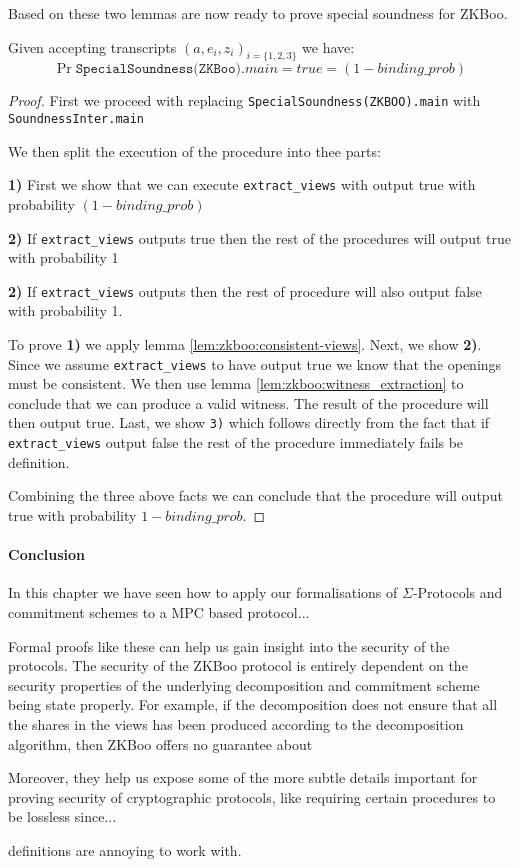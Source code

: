 Based on these two lemmas are now ready to prove special soundness for ZKBoo.

\begin{lemma}
  Given accepting transcripts $(a, e_{i}, z_{i})_{i = \{1,2,3\}}$ we have:
  \[
    \Pr{\texttt{SpecialSoundness(ZKBoo)}.main = true} = (1 - binding\_{prob})
  \]
\end{lemma}
\begin{proof}
  First we proceed with replacing \texttt{SpecialSoundness(ZKBOO).main} with \texttt{SoundnessInter.main}

  We then split the execution of the procedure into thee parts:

  \noindent\textbf{1)} First we show that we can execute \texttt{extract\_views}
  with output true with probability $(1 - binding\_{prob})$

  \noindent\textbf{2)} If \texttt{extract\_views} outputs true then the rest of
  the procedures will output true with probability 1

  \noindent\textbf{2)} If \texttt{extract\_views} outputs then the rest of
  procedure will also output false with probability 1.

  To prove \textbf{1)} we apply lemma \ref{lem:zkboo:consistent-views}. Next, we
  show \textbf{2)}. Since we assume \texttt{extract\_views} to have output true
  we know that the openings must be consistent. We then use lemma
  \ref{lem:zkboo:witness_extraction} to conclude that we can produce a valid
  witness. The result of the procedure will then output true.
  Last, we show \texttt{3)} which follows directly from the fact that if
  \texttt{extract\_views} output false the rest of the procedure immediately
  fails be definition.


  Combining the three above facts we can conclude that the procedure will output
  true with probability $1 - binding\_{prob}$.
\end{proof}

\paragraph{Conclusion}
In this chapter we have seen how to apply our formalisations of
$\Sigma$-Protocols and commitment schemes to a MPC based protocol...

Formal proofs like these can help us gain insight into the security of the
protocols. The security of the ZKBoo protocol is entirely dependent on the
security properties of the underlying decomposition and commitment scheme being
state properly. For example, if the decomposition does not ensure that all the
shares in the views has been produced according to the decomposition algorithm,
then ZKBoo offers no guarantee about

Moreover, they help us expose some of the more subtle details important for
proving security of cryptographic protocols, like requiring certain procedures
to be lossless since...


definitions are annoying to work with.



